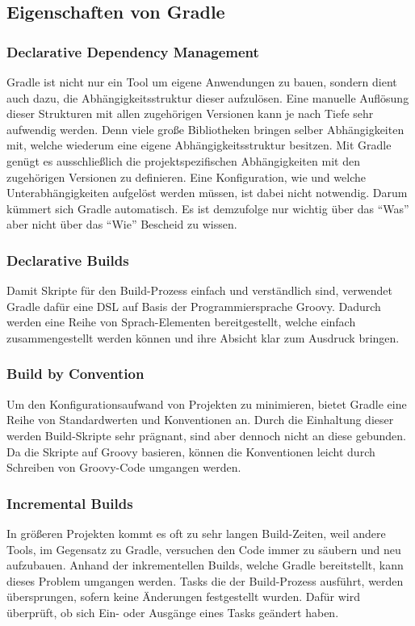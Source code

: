 \subsection{Eigenschaften von Gradle}
\subsubsection{Declarative Dependency Management}
Gradle ist nicht nur ein Tool um eigene Anwendungen zu bauen, sondern dient auch dazu, die Abhängigkeitsstruktur dieser aufzulösen. Eine manuelle Auflösung dieser Strukturen mit allen zugehörigen Versionen kann je nach Tiefe sehr aufwendig werden. Denn viele große Bibliotheken bringen selber Abhängigkeiten mit, welche wiederum eine eigene Abhängigkeitsstruktur besitzen. Mit Gradle genügt es ausschließlich die projektspezifischen Abhängigkeiten mit den zugehörigen Versionen zu definieren. Eine Konfiguration, wie und welche Unterabhängigkeiten aufgelöst werden müssen, ist dabei nicht notwendig. Darum kümmert sich Gradle automatisch. Es ist demzufolge nur wichtig über das \enquote{Was} aber nicht über das \enquote{Wie} Bescheid zu wissen.

\subsubsection{Declarative Builds}
Damit Skripte für den Build-Prozess einfach und verständlich sind, verwendet Gradle dafür eine \gls{DSL} auf Basis der Programmiersprache Groovy. Dadurch werden eine Reihe von Sprach-Elementen bereitgestellt, welche einfach zusammengestellt werden können und ihre Absicht klar zum Ausdruck bringen.

\subsubsection{Build by Convention}
Um den Konfigurationsaufwand von Projekten zu minimieren, bietet Gradle eine Reihe von Standardwerten und Konventionen an. Durch die Einhaltung dieser werden Build-Skripte sehr prägnant, sind aber dennoch nicht an diese gebunden. Da die Skripte auf Groovy basieren, können die Konventionen leicht durch Schreiben von Groovy-Code umgangen werden.

\subsubsection{Incremental Builds}
In größeren Projekten kommt es oft zu sehr langen Build-Zeiten, weil andere Tools, im Gegensatz zu Gradle, versuchen den Code immer zu säubern und neu aufzubauen. Anhand der inkrementellen Builds, welche Gradle bereitstellt, kann dieses Problem umgangen werden. Tasks die der Build-Prozess ausführt, werden übersprungen, sofern keine Änderungen festgestellt wurden. Dafür wird überprüft, ob sich Ein- oder Ausgänge eines Tasks geändert haben.

